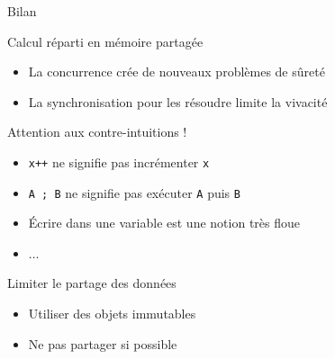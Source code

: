 
\begingroup

\begin{frame}[fragile]{Bilan}

  \vfill
  \begin{block}{Calcul réparti en mémoire partagée}
    \begin{itemize}
    \item La concurrence crée de nouveaux problèmes de sûreté
    \item La synchronisation pour les résoudre limite la vivacité
    \end{itemize}
  \end{block}
  \vfill
  \begin{block}{Attention aux contre-intuitions !}
    \begin{itemize}
    \item \lstinline{x++} \alert{ne signifie pas} \og incrémenter \lstinline{x} \fg
    \item \lstinline{A ; B} \alert{ne signifie pas} \og exécuter \lstinline{A} puis \lstinline{B} \fg
    \item \og Écrire dans une variable \fg{} est une notion très floue
    \item ...
    \end{itemize}
  \end{block}
  \vfill
  \begin{alertblock}{Limiter le partage des données}
    \begin{itemize}
    \item Utiliser des objets immutables
    \item Ne pas partager si possible
    \end{itemize}
  \end{alertblock}
  \vfill
\end{frame}

\endgroup
\endinput
